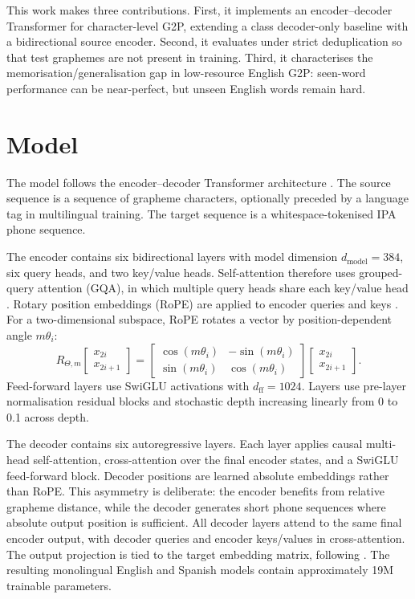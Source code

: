 \documentclass[11pt]{article}
\begin{document}
This work makes three contributions. First, it implements an encoder--decoder
Transformer for character-level G2P, extending a class decoder-only baseline
with a bidirectional source encoder. Second, it evaluates under strict
deduplication so that test graphemes are not present in training. Third, it
characterises the memorisation/generalisation gap in low-resource English G2P:
seen-word performance can be near-perfect, but unseen English words remain hard.

\section{Model}
\label{sec:model}

The model follows the encoder--decoder Transformer architecture
\citep{vaswani2017attention}. The source sequence is a sequence of grapheme
characters, optionally preceded by a language tag in multilingual training. The
target sequence is a whitespace-tokenised IPA phone sequence.

The encoder contains six bidirectional layers with model dimension
$d_{\text{model}}=384$, six query heads, and two key/value heads. Self-attention
therefore uses grouped-query attention (GQA), in which multiple query heads
share each key/value head \citep{ainslie2023gqa}. Rotary position embeddings
(RoPE) are applied to encoder queries and keys \citep{su2021roformer}. For a
two-dimensional subspace, RoPE rotates a vector by position-dependent angle
$m\theta_i$:
\begin{equation}
\label{eq:rope}
R_{\Theta,m}
\begin{bmatrix}x_{2i}\\x_{2i+1}\end{bmatrix}
=
\begin{bmatrix}
\cos(m\theta_i) & -\sin(m\theta_i)\\
\sin(m\theta_i) & \cos(m\theta_i)
\end{bmatrix}
\begin{bmatrix}x_{2i}\\x_{2i+1}\end{bmatrix}.
\end{equation}
Feed-forward layers use SwiGLU activations \citep{shazeer2020glu} with
$d_{\text{ff}}=1024$. Layers use pre-layer normalisation residual blocks and
stochastic depth increasing linearly from 0 to 0.1 across depth.

The decoder contains six autoregressive layers. Each layer applies causal
multi-head self-attention, cross-attention over the final encoder states, and a
SwiGLU feed-forward block. Decoder positions are learned absolute embeddings
rather than RoPE. This asymmetry is deliberate: the encoder benefits from
relative grapheme distance, while the decoder generates short phone sequences
where absolute output position is sufficient. All decoder layers attend to the
same final encoder output, with decoder queries and encoder keys/values in
cross-attention. The output projection is tied to the target embedding matrix,
following \citet{press2017using}. The resulting monolingual English and Spanish
models contain approximately 19M trainable parameters.
\end{document}

